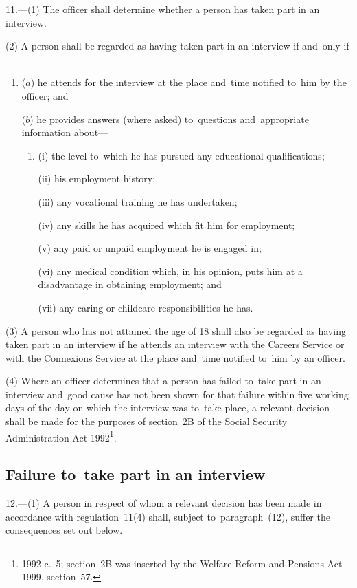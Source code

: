 \documentclass[12pt,a4paper]{article}
\begin{document}
11.---(1)  The officer shall determine whether a person has taken part in an interview.

(2) A person shall be regarded as having taken part in an interview if and~only if—
\begin{enumerate}\item[]
($a$) he attends for the interview at the place and~time notified to~him by the officer; and

($b$) he provides answers (where asked) to~questions and~appropriate information about—
\begin{enumerate}\item[]
(i) the level to~which he has pursued any educational qualifications;

\enlargethispage{-\baselineskip}

(ii) his employment history;

(iii) any vocational training he has undertaken;

(iv) any skills he has acquired which fit him for employment;

(v) any paid or unpaid employment he is engaged in;

(vi) any medical condition which, in his opinion, puts him at a disadvantage in obtaining employment; and

(vii) any caring or childcare responsibilities he has.
\end{enumerate}
\end{enumerate}

(3) A person who has not attained the age of 18 shall also be regarded as having taken part in an interview if he attends an interview with the Careers Service or with the Connexions Service at the place and~time notified to~him by an officer.

(4) Where an officer determines that a person has failed to~take part in an interview and~good cause has not been shown for that failure within five working days of the day on which the interview was to~take place, a relevant decision shall be made for the purposes of section~2B of the Social Security Administration Act 1992\footnote{1992 c.~5; section~2B was inserted by the Welfare Reform and Pensions Act 1999, section~57.}.

\subsection[12. Failure to~take part in an interview]{Failure to~take part in an interview}

12.---(1)  A person in respect of whom a relevant decision has been made in accordance with regulation~11(4) shall, subject to~paragraph~(12), suffer the consequences set out below.
\end{document}
